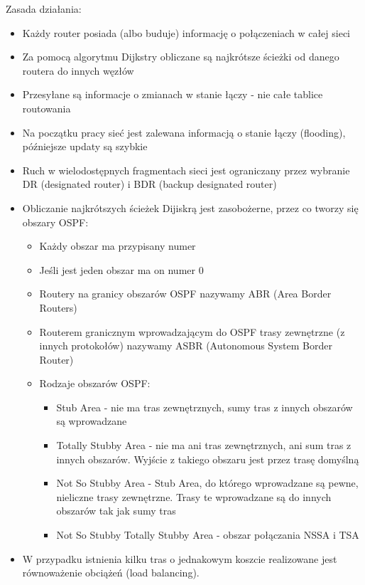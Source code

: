 \documentclass[main.tex]{subfiles}
\begin{document}
    Zasada działania:
    \begin{itemize}
        \item Każdy router posiada (albo buduje) informację o połączeniach w całej sieci
        \item Za pomocą algorytmu Dijkstry obliczane są najkrótsze ścieżki od danego routera do innych węzłów
        \item Przesyłane są informacje o zmianach w stanie łączy - nie całe tablice routowania
        \item Na początku pracy sieć jest zalewana informacją o stanie łączy (flooding), późniejsze updaty są szybkie
        \item Ruch w wielodostępnych fragmentach sieci jest ograniczany przez wybranie DR (designated router) i BDR (backup designated router)
        \item Obliczanie najkrótszych ścieżek Dijiskrą jest zasobożerne, przez co
        tworzy się obszary OSPF:
        \begin{itemize}
            \item Każdy obszar ma przypisany numer
            \item Jeśli jest jeden obszar ma on numer 0
            \item Routery na granicy obszarów OSPF nazywamy ABR (Area Border Routers)
            \item Routerem granicznym wprowadzającym do OSPF trasy zewnętrzne (z innych protokołów) nazywamy ASBR (Autonomous System Border Router)
            \item Rodzaje obszarów OSPF:
            \begin{itemize}
                \item Stub Area - nie ma tras zewnętrznych, sumy tras z innych obszarów są wprowadzane
                \item Totally Stubby Area - nie ma ani tras zewnętrznych, ani sum tras z innych obszarów. Wyjście z takiego obszaru jest przez trasę domyślną
                \item Not So Stubby Area - Stub Area, do którego wprowadzane są pewne, nieliczne trasy zewnętrzne. Trasy te wprowadzane są do innych obszarów tak jak sumy tras
                \item Not So Stubby Totally Stubby Area - obszar połączania NSSA i TSA
            \end{itemize}
        \end{itemize}
        \item W przypadku istnienia kilku tras o jednakowym koszcie realizowane jest równoważenie obciążeń (load balancing).
    \end{itemize}
\end{document}
